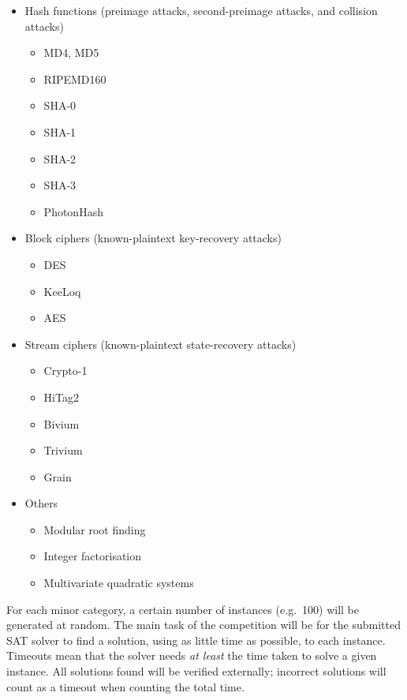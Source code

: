 \documentclass[12pt, a4paper]{article}
\begin{document}
\begin{itemize}
\item Hash functions (preimage attacks, second-preimage attacks, and collision attacks)
\begin{itemize}
\item MD4, MD5~\cite{Jova2005, Miro2006, De2007}
\item RIPEMD160
\item SHA-0~\cite{Miro2006}
\item SHA-1~\cite{Mora2010}
\item SHA-2
\item SHA-3~\cite{Mora2010}
\item PhotonHash
\end{itemize}

\item Block ciphers (known-plaintext key-recovery attacks)
\begin{itemize}
\item DES~\cite{Massacci2000, Courtois2007}
\item KeeLoq~\cite{Cour2008}
\item AES
\end{itemize}

\item Stream ciphers (known-plaintext state-recovery attacks)
\begin{itemize}
\item Crypto-1~\cite{Soos2009}
\item HiTag2~\cite{Soos2009}
\item Bivium~\cite{Soos2009, McDonald2010}
\item Trivium~\cite{Soos2009, McDonald2010}
\item Grain~\cite{Soos2010}
\end{itemize}

\item Others
\begin{itemize}
\item Modular root finding~\cite{Fiorini2003}
\item Integer factorisation~\cite{Sreb2007}
\item Multivariate quadratic systems~\cite{Bard2007}
\end{itemize}
\end{itemize}

For each minor category, a certain number of instances (e.g.\ 100) will be generated at random. The main task of the competition will be for the submitted SAT solver to find a solution, using as little time as possible, to each instance. Timeouts mean that the solver needs \emph{at least} the time taken to solve a given instance. All solutions found will be verified externally; incorrect solutions will count as a timeout when counting the total time.
\end{document}
